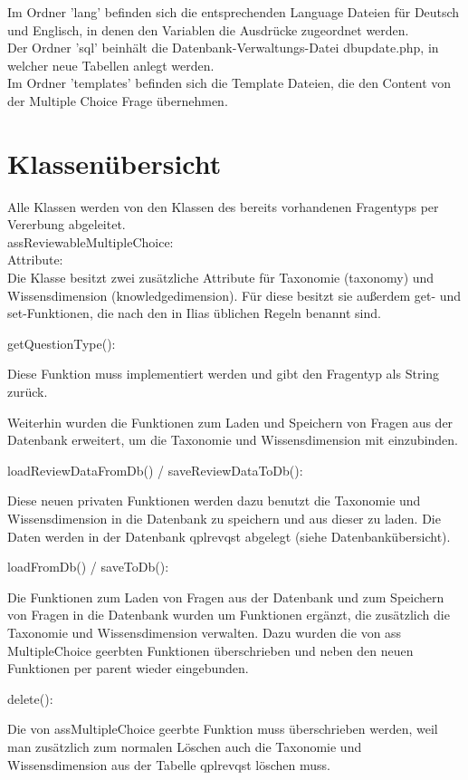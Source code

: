 \documentclass[a4paper]{scrreprt}
\begin{document}
Im Ordner 'lang' befinden sich die entsprechenden Language Dateien für Deutsch und Englisch, in denen den Variablen die Ausdrücke zugeordnet werden.\\
Der Ordner 'sql' beinhält die Datenbank-Verwaltungs-Datei dbupdate.php, in welcher neue Tabellen anlegt werden.\\
Im Ordner 'templates' befinden sich die Template Dateien, die den Content von der Multiple Choice Frage übernehmen.\\


\section{Klassenübersicht}

Alle Klassen werden von den Klassen des bereits vorhandenen Fragentyps per Vererbung abgeleitet.\\ 
assReviewableMultipleChoice:\\
Attribute:\\
Die Klasse besitzt zwei zusätzliche Attribute für Taxonomie (taxonomy) und Wissensdimension (knowledge\textunderscore dimension).
Für diese besitzt sie außerdem get- und set-Funktionen, die nach den in Ilias üblichen Regeln benannt sind.

getQuestionType():

Diese Funktion muss implementiert werden und gibt den Fragentyp als String zurück.


Weiterhin wurden die Funktionen zum Laden und Speichern von Fragen aus der Datenbank erweitert, um die Taxonomie und Wissensdimension mit einzubinden.

loadReviewDataFromDb() / saveReviewDataToDb():

Diese neuen privaten Funktionen werden dazu benutzt die Taxonomie und Wissensdimension in die Datenbank zu speichern und aus dieser zu laden.
Die Daten werden in der Datenbank qpl\textunderscore rev\textunderscore qst abgelegt (siehe Datenbankübersicht).

loadFromDb() / saveToDb():

Die Funktionen zum Laden von Fragen aus der Datenbank und zum Speichern von Fragen in die Datenbank wurden um Funktionen ergänzt, 
die zusätzlich die Taxonomie und Wissensdimension verwalten. 
Dazu wurden die von ass MultipleChoice geerbten Funktionen überschrieben und neben den neuen Funktionen per parent wieder eingebunden.

delete():

Die von assMultipleChoice geerbte Funktion muss überschrieben werden, weil man zusätzlich zum normalen Löschen auch die Taxonomie und 
Wissensdimension aus der Tabelle qpl\textunderscore rev\textunderscore qst löschen muss.
\end{document}
